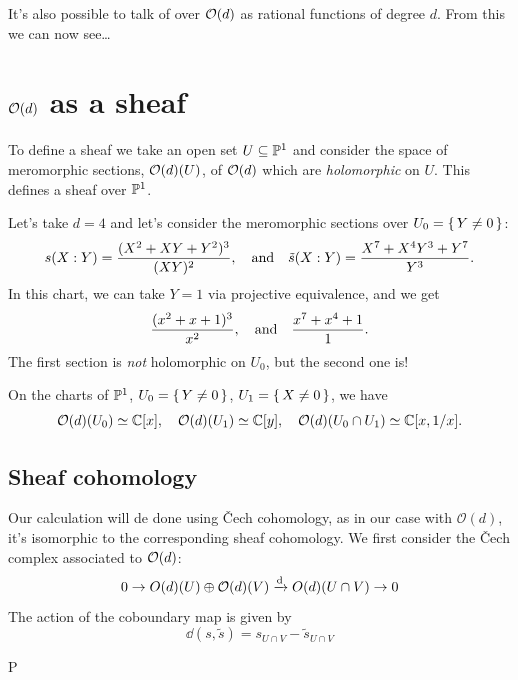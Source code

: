 \documentclass[12pt]{memoir}
\def\nextra {P}
\begin{document}
It's also possible to talk of  over $\mathcal{O}(d)$ as rational functions of degree $d$. From this we can now see\dots

\section{$\mathcal{O}(d)$ as a sheaf}

To define a sheaf we take an open set $U\subseteq\mathbb{P}^1$ and consider the space of meromorphic sections, $\mathcal{O}(d)(U)$, of $\mathcal{O}(d)$ which are \emph{holomorphic} on $U$. This defines a sheaf over $\mathbb{P}^1$. 

\begin{Ex}
Let's take $d=4$ and let's consider the meromorphic sections over $U_0=\{\,Y\neq 0\,\}$:
$$s(X:Y)=\frac{(X^2+XY+Y^2)^3}{(XY)^2},\quad\text{and}\quad \tilde{s}(X:Y)=\frac{X^7+X^4Y^3+Y^7}{Y^3}.$$
In this chart, we can take $Y=1$ via projective equivalence, and we get 
$$\frac{(x^2+x+1)^3}{x^2},\quad\text{and}\quad\frac{x^7+x^4+1}{1}.$$
The first section is \emph{not} holomorphic on $U_0$, but the second one is!
\end{Ex}

\begin{Prop}
On the charts of $\mathbb{P}^1$, $U_0=\{\,Y\neq 0\,\}$, $U_1=\{\,X\neq 0\,\}$, we have 
$$\mathcal{O}(d)(U_0)\simeq\mathbb{C}[x],\quad\mathcal{O}(d)(U_1)\simeq\mathbb{C}[y],\quad\mathcal{O}(d)(U_0\cap U_1)\simeq\mathbb{C}[x,1/x].$$
\end{Prop}

\subsection{Sheaf cohomology}

Our calculation will de done using \v{C}ech cohomology, as in our case with \(\mathcal{O}(d)\), it's isomorphic to the corresponding sheaf cohomology.
We first consider the \v{C}ech complex associated to $\mathcal{O}(d)$:
$$0\to O(d)(U)\oplus\mathcal{O}(d)(V)\xrightarrow[]{\dd}O(d)(U\cap V)\to 0$$
The action of the coboundary map is given by 
$$\dd(s,\tilde{s})=s_{U\cap V}-\tilde{s}_{U\cap V}$$


\ifx\nextra\undefined
\printindex
\else\fi
\nocite{*}


\end{document}
